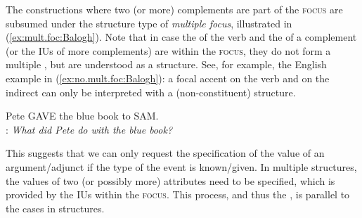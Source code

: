 \documentclass[output=paper,colorlinks,citecolor=brown]{langscibook}
\begin{document}
The constructions where two (or more) complements are part of the {\textsc{focus}} are subsumed under the  structure type of \textit{multiple focus}, illustrated in (\ref{ex:mult.foc:Balogh}). Note that in case the  of the verb and the  of a complement (or the IUs of more complements) are within the {\textsc{focus}}, they do not form a multiple , but are understood as a  structure. See, for example, the English example in (\ref{ex:no.mult.foc:Balogh}): a focal accent on the verb and on the indirect  can only be interpreted with a (non-constituent)  structure. 

\ea\label{ex:no.mult.foc:Balogh}
Pete GAVE the blue book to SAM. \\
: \textit{What did Pete do with the blue book?}
\z

This suggests that we can only request the  specification of the value of an argument/adjunct if  the type of the event is known/given. In multiple  structures, the values of two (or possibly more) attributes need to be specified, which is provided by the IUs within the {\textsc{focus}}. This process, and thus the , is parallel to the cases in  structures. 
\end{document}
